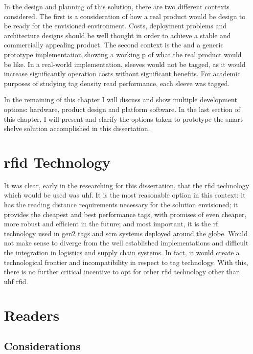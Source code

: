 In the design and planning of this solution, there are two different contexts considered. The first is a consideration of how a real product would be design to be ready for the envisioned environment. Costs, deployment problems and architecture designs should be well thought in order to achieve a stable and commercially appealing product.
The second context is the  and a generic prototype implementation showing a working p of what the real product would be like.
In a real-world implementation, sleeves would not be tagged, as it would increase significantly operation costs without significant benefits. For academic purposes of studying tag density read performance, each sleeve was tagged.

In the remaining of this chapter I will discuss and show multiple development options: hardware, product design and platform software. In the last section of this chapter, I will present and clarify the options taken to prototype the smart shelve solution accomplished in this dissertation.

\section{\acs{rfid} Technology}

It was clear, early in the researching for this dissertation, that the \ac{rfid} technology which would be used was \ac{uhf}. 
It is the most reasonable option in this context: it has the reading distance requirements necessary for the solution envisioned; it provides the cheapest and best performance tags, with promises of even cheaper, more robust and efficient in the future; and most important, it is the \ac{rf} technology used in \ac{gen2} tags and \ac{scm} systems deployed around the globe. 
Would not make sense to diverge from the well established implementations and difficult the integration in logistics and supply chain systems.
In fact, it would create a technological frontier and incompatibility in respect to tag technology.
With this, there is no further critical incentive to opt for other \ac{rfid} technology other than \ac{uhf} \ac{rfid}.

\section{Readers}

\subsection{Considerations}

